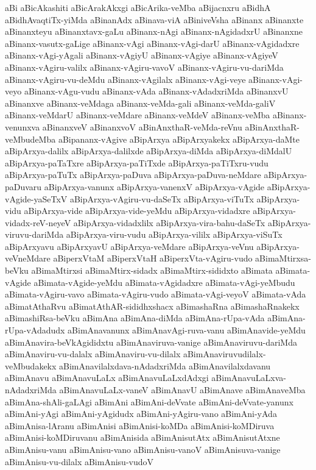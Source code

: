 {aBi
aBicAkashiti
aBicArakAkxgi
aBicArika-veMba
aBijacnxru
aBidhA
aBidhAvaqtiTx-yiMda
aBinanAdx
aBinava-viA
aBiniveVsha
aBinanx
aBinanxte
aBinanxteyu
aBinanxtavx-gaLu
aBinanx-nAgi
aBinanx-nAgidadxrU
aBinanxne
aBinanx-vasutx-gaLige
aBinanx-vAgi
aBinanx-vAgi-darU
aBinanx-vAgidadxre
aBinanx-vAgi-yAgali
aBinanx-vAgiyU
aBinanx-vAgiye
aBinanx-vAgiyeV
aBinanx-vAgiru-valilx
aBinanx-vAgiru-vavoV
aBinanx-vAgiru-vu-dariMda
aBinanx-vAgiru-vu-deMdu
aBinanx-vAgilalx
aBinanx-vAgi-veye
aBinanx-vAgi-veyo
aBinanx-vAgu-vudu
aBinanx-vAda
aBinanx-vAdadxriMda
aBinanxvU
aBinanxve
aBinanx-veMdaga
aBinanx-veMda-gali
aBinanx-veMda-galiV
aBinanx-veMdarU
aBinanx-veMdare
aBinanx-veMdeV
aBinanx-veMba
aBinanx-venunxva
aBinanxveV
aBinanxvoV
aBinAnxthaR-veMda-reVnu
aBinAnxthaR-veMbudeMba
aBipananx-vAgive
aBipArxya
aBipArxyakekx
aBipArxya-daMte
aBipArxya-dalilx
aBipArxya-dalilxde
aBipArxya-diMda
aBipArxya-diMdalU
aBipArxya-paTaTxre
aBipArxya-paTiTxde
aBipArxya-paTiTxru-vudu
aBipArxya-paTuTx
aBipArxya-paDuva
aBipArxya-paDuva-neMdare
aBipArxya-paDuvaru
aBipArxya-vanunx
aBipArxya-vanenxV
aBipArxya-vAgide
aBipArxya-vAgide-yaSeTxV
aBipArxya-vAgiru-vu-daSeTx
aBipArxya-viTuTx
aBipArxya-vidu
aBipArxya-vide
aBipArxya-vide-yeMdu
aBipArxya-vidadxre
aBipArxya-vidadx-reV-neyeV
aBipArxya-vidadxlilx
aBipArxya-vira-bahu-daSeTx
aBipArxya-viruvu-dariMda
aBipArxya-viru-vudu
aBipArxya-vililx
aBipArxya-viSuTx
aBipArxyavu
aBipArxyavU
aBipArxya-veMdare
aBipArxya-veVnu
aBipArxya-veVneMdare
aBiperxVtaM
aBiperxVtaH
aBiperxVta-vAgiru-vudo
aBimaMtirxsa-beVku
aBimaMtirxsi
aBimaMtirx-sidadx
aBimaMtirx-sididxto
aBimata
aBimata-vAgide
aBimata-vAgide-yeMdu
aBimata-vAgidadxre
aBimata-vAgi-yeMbudu
aBimata-vAgiru-vavo
aBimata-vAgiru-vudo
aBimata-vAgi-veyoV
aBimata-vAda
aBimatAthaRvu
aBimatAthAR-sididhxshacx
aBimashaRna
aBimashaRnakekx
aBimashiRsa-beVku
aBimAna
aBimAna-diMda
aBimAna-rUpa-vAda
aBimAna-rUpa-vAdadudx
aBimAnavanunx
aBimAnavAgi-ruva-vanu
aBimAnavide-yeMdu
aBimAnavira-beVkAgididxtu
aBimAnaviruva-vanige
aBimAnaviruvu-dariMda
aBimAnaviru-vu-dalalx
aBimAnaviru-vu-dilalx
aBimAnaviruvudilalx-veMbudakekx
aBimAnavilalxdava-nAdadxriMda
aBimAnavilalxdavanu
aBimAnavu
aBimAnavuLaLx
aBimAnavuLaLxdAdxgi
aBimAnavuLaLxva-nAdadxriMda
aBimAnavuLaLx-vaneV
aBimAnavU
aBimAnave
aBimAnaveMba
aBimAna-shAli-gaLAgi
aBimAni
aBimAni-deVvate
aBimAni-deVvate-yanunx
aBimAni-yAgi
aBimAni-yAgidudx
aBimAni-yAgiru-vano
aBimAni-yAda
aBimAnisa-lAranu
aBimAnisi
aBimAnisi-koMDa
aBimAnisi-koMDiruva
aBimAnisi-koMDiruvanu
aBimAnisida
aBimAnisutAtx
aBimAnisutAtxne
aBimAnisu-vanu
aBimAnisu-vano
aBimAnisu-vanoV
aBimAnisuva-vanige
aBimAnisu-vu-dilalx
aBimAnisu-vudoV
}
